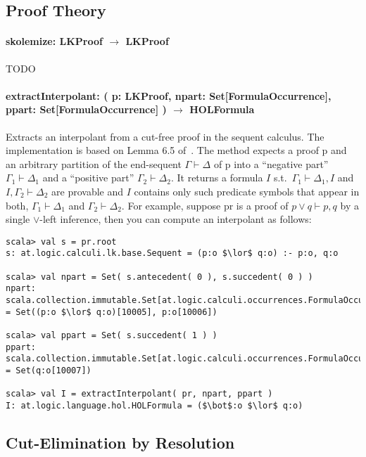 \documentclass[a4paper, 11pt]{report}
\newcommand{\seq}{\vdash}	%
\begin{document}
\subsection{Proof Theory}

\paragraph{\textbf{skolemize: LKProof $\rightarrow$ LKProof}}
{\color{red}TODO}

\paragraph{\textbf{extractInterpolant: ( p: LKProof, npart: Set[FormulaOccurrence],
ppart: Set[FormulaOccurrence] ) $\rightarrow$ HOLFormula}}

Extracts an interpolant from a cut-free proof in the sequent calculus. The
implementation is based on Lemma 6.5 of~\cite{Takeuti87Proof}. The method expects
a proof p and an arbitrary partition of the end-sequent $\Gamma \seq \Delta$ of p into a 
``negative part'' $\Gamma_1\seq\Delta_1$ and a ``positive part'' $\Gamma_2 \seq \Delta_2$.
It returns a formula $I$ s.t.\ $\Gamma_1\seq\Delta_1, I$ and $I,\Gamma_2\seq\Delta_2$
are provable and $I$ contains only such predicate symbols that appear in both, $\Gamma_1\seq\Delta_1$
and $\Gamma_2\seq\Delta_2$. For example, suppose pr is a proof of $p \lor q \seq p, q$
by a single $\lor$-left inference, then you can compute an interpolant as follows:
\begin{lstlisting}
scala> val s = pr.root
s: at.logic.calculi.lk.base.Sequent = (p:o $\lor$ q:o) :- p:o, q:o

scala> val npart = Set( s.antecedent( 0 ), s.succedent( 0 ) )
npart: scala.collection.immutable.Set[at.logic.calculi.occurrences.FormulaOccurrence] = Set((p:o $\lor$ q:o)[10005], p:o[10006])

scala> val ppart = Set( s.succedent( 1 ) )
ppart: scala.collection.immutable.Set[at.logic.calculi.occurrences.FormulaOccurrence] = Set(q:o[10007])

scala> val I = extractInterpolant( pr, npart, ppart )
I: at.logic.language.hol.HOLFormula = ($\bot$:o $\lor$ q:o)
\end{lstlisting}

\subsection{Cut-Elimination by Resolution}
\end{document}
